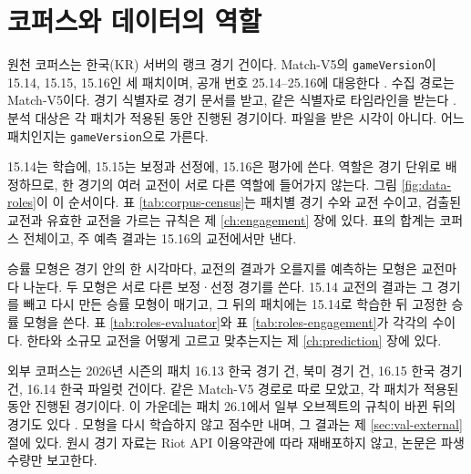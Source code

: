 \section{코퍼스와 데이터의 역할}
\label{sec:data-corpus}
\label{sec:data-roles}

원천 코퍼스는 한국(KR) 서버의 랭크 경기 \numMatchesTotal{} 건이다. Match-V5의 \texttt{gameVersion}이 15.14, 15.15, 15.16인 세 패치이며, 공개 번호 25.14--25.16에 대응한다 \cite{lolwiki2026v2514,lolwiki2026v2516}. 수집 경로는 Match-V5이다. 경기 식별자로 경기 문서를 받고, 같은 식별자로 타임라인을 받는다 \cite{riotapi2024matchv5,riotapi2024timeline}. 분석 대상은 각 패치가 적용된 동안 진행된 경기이다. 파일을 받은 시각이 아니다. 어느 패치인지는 \texttt{gameVersion}으로 가른다.

15.14는 학습에, 15.15는 보정과 선정에, 15.16은 평가에 쓴다. 역할은 경기 단위로 배정하므로, 한 경기의 여러 교전이 서로 다른 역할에 들어가지 않는다. 그림 \ref{fig:data-roles}이 이 순서이다. 표 \ref{tab:corpus-census}는 패치별 경기 수와 교전 수이고, 검출된 교전과 유효한 교전을 가르는 규칙은 제 \ref{ch:engagement} 장에 있다. 표의 합계는 코퍼스 전체이고, 주 예측 결과는 15.16의 교전에서만 낸다.




승률 모형은 경기 안의 한 시각마다, 교전의 결과가 오를지를 예측하는 모형은 교전마다 나눈다. 두 모형은 서로 다른 보정·선정 경기를 쓴다. 15.14 교전의 결과는 그 경기를 빼고 다시 만든 승률 모형이 매기고, 그 뒤의 패치에는 15.14로 학습한 뒤 고정한 승률 모형을 쓴다. 표 \ref{tab:roles-evaluator}와 표 \ref{tab:roles-engagement}가 각각의 수이다. 한타와 소규모 교전을 어떻게 고르고 맞추는지는 제 \ref{ch:prediction} 장에 있다.




외부 코퍼스는 2026년 시즌의 패치 16.13 한국 경기 \numExtKRCollected{} 건, 북미 경기 \numExtNACollected{} 건, 16.15 한국 경기 \numExtKRbCollected{} 건, 16.14 한국 파일럿 \numExtPilotCollected{} 건이다. 같은 Match-V5 경로로 따로 모았고, 각 패치가 적용된 동안 진행된 경기이다. 이 가운데는 패치 26.1에서 일부 오브젝트의 규칙이 바뀐 뒤의 경기도 있다 \cite{riot2026patch261}. 모형을 다시 학습하지 않고 점수만 내며, 그 결과는 제 \ref{sec:val-external} 절에 있다. 원시 경기 자료는 Riot API 이용약관에 따라 재배포하지 않고, 논문은 파생 수량만 보고한다.
